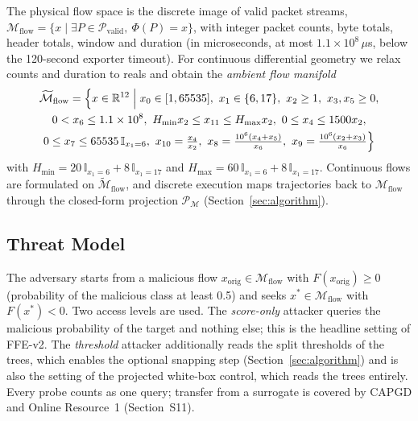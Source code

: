 The physical flow space is the discrete image of valid packet streams, $\mathcal{M}_{\text{flow}}=\{x\mid\exists P\in\mathcal{P}_{\text{valid}},\ \Phi(P)=x\}$, with integer packet counts, byte totals, header totals, window and duration (in microseconds, at most $1.1\times10^8\,\mu$s, below the 120-second exporter timeout). For continuous differential geometry we relax counts and duration to reals and obtain the \emph{ambient flow manifold}
\begin{gather}
    \widetilde{\mathcal{M}}_{\text{flow}}=\Big\{x\in\mathbb{R}^{12}\;\Big|\;x_0\in[1,65535],\ x_1\in\{6,17\},\ x_2\ge1,\ x_3,x_5\ge0,\notag\\
    0<x_6\le1.1\times10^8,\ H_{\min}x_2\le x_{11}\le H_{\max}x_2,\ 0\le x_4\le1500x_2,\notag\\
    0\le x_7\le65535\,\mathbb{I}_{x_1=6},\ x_{10}=\tfrac{x_4}{x_2},\ x_8=\tfrac{10^6(x_4+x_5)}{x_6},\ x_9=\tfrac{10^6(x_2+x_3)}{x_6}\Big\}
\end{gather}
with $H_{\min}=20\,\mathbb{I}_{x_1=6}+8\,\mathbb{I}_{x_1=17}$ and $H_{\max}=60\,\mathbb{I}_{x_1=6}+8\,\mathbb{I}_{x_1=17}$. Continuous flows are formulated on $\widetilde{\mathcal{M}}_{\text{flow}}$, and discrete execution maps trajectories back to $\mathcal{M}_{\text{flow}}$ through the closed-form projection $\mathcal{P}_{\mathcal{M}}$ (Section~\ref{sec:algorithm}).

\subsection{Threat Model}
The adversary starts from a malicious flow $x_{\text{orig}}\in\mathcal{M}_{\text{flow}}$ with $F(x_{\text{orig}})\ge0$ (probability of the malicious class at least 0.5) and seeks $x^*\in\mathcal{M}_{\text{flow}}$ with $F(x^*)<0$. Two access levels are used. The \emph{score-only} attacker queries the malicious probability of the target and nothing else; this is the headline setting of FFE-v2. The \emph{threshold} attacker additionally reads the split thresholds of the trees, which enables the optional snapping step (Section~\ref{sec:algorithm}) and is also the setting of the projected white-box control, which reads the trees entirely. Every probe counts as one query; transfer from a surrogate is covered by CAPGD and Online Resource~1 (Section~S11).

